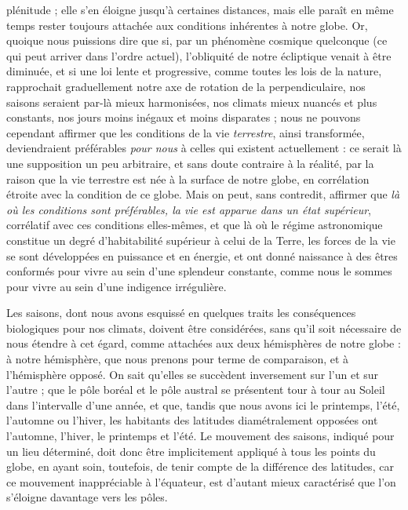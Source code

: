 \documentclass[a4paper, 11pt, oneside]{article}
\begin{document}
plénitude ; elle s'en éloigne jusqu'à certaines distances, mais elle paraît en même temps rester toujours attachée aux conditions inhérentes à notre globe. Or, quoique nous puissions dire que si, par un phénomène cosmique quelconque (ce qui peut arriver dans l'ordre actuel), l'obliquité de notre écliptique venait à être diminuée, et si une loi lente et progressive, comme toutes les lois de la nature, rapprochait graduellement notre axe de rotation de la perpendiculaire, nos saisons seraient par-là mieux harmonisées, nos climats mieux nuancés et plus constants, nos jours moins inégaux et moins disparates ; nous ne pouvons cependant affirmer que les conditions de la vie \emph{terrestre}, ainsi transformée, deviendraient préférables \emph{pour nous} à celles qui existent actuellement : ce serait là une supposition un peu arbitraire, et sans doute contraire à la réalité, par la raison que la vie terrestre est née à la surface de notre globe, en corrélation étroite avec la condition de ce globe. Mais on peut, sans contredit, affirmer que \emph{là où les conditions sont préférables, la vie est apparue dans un état supérieur}, corrélatif avec ces conditions elles-mêmes, et que là où le régime astronomique constitue un degré d'habitabilité supérieur à celui de la Terre, les forces de la vie se sont développées en puissance et en énergie, et ont donné naissance à des êtres conformés pour vivre au sein d'une splendeur constante, comme nous le sommes pour vivre au sein d'une indigence irrégulière.

Les saisons, dont nous avons esquissé en quelques traits les conséquences biologiques pour nos climats, doivent être considérées, sans qu'il soit nécessaire de nous étendre à cet égard, comme attachées aux deux hémisphères de notre globe : à notre hémisphère, que nous prenons pour terme de comparaison, et à l'hémisphère opposé. On sait qu'elles se succèdent inversement sur l'un et sur l'autre ; que le pôle boréal et le pôle austral se présentent tour à tour au Soleil dans l'intervalle d'une année, et que, tandis que nous avons ici le printemps, l'été, l'automne ou l'hiver, les habitants des latitudes diamétralement opposées ont l'automne, l'hiver, le printemps et l'été. Le mouvement des saisons, indiqué pour un lieu déterminé, doit donc être implicitement appliqué à tous les points du globe, en ayant soin, toutefois, de tenir compte de la différence des latitudes, car ce mouvement inappréciable à l'équateur, est d'autant mieux caractérisé que l'on s'éloigne davantage vers les pôles.
\end{document}
